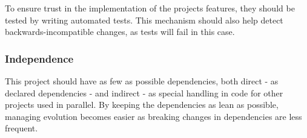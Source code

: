 To ensure trust in the implementation of the project\textquotesingle{}s features, they should be tested by writing automated tests. This mechanism should also help detect backwards-\/incompatible changes, as tests will fail in this case.

\subsubsection*{Independence}

This project should have as few as possible dependencies, both direct -\/ as declared dependencies -\/ and indirect -\/ as special handling in code for other projects used in parallel. By keeping the dependencies as lean as possible, managing evolution becomes easier as breaking changes in dependencies are less frequent. 